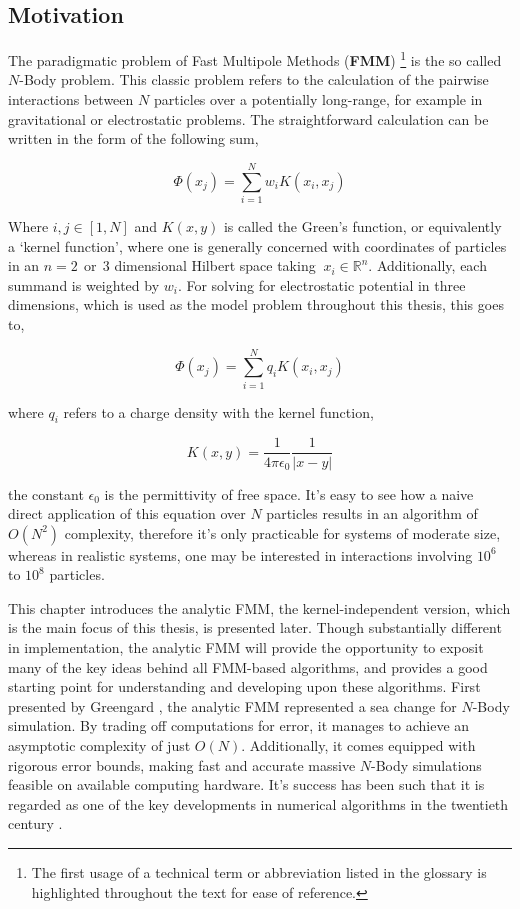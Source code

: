 \subsection{Motivation}
The paradigmatic problem of Fast Multipole Methods (\textbf{\gls{FMM}})
\footnote{The first usage of a technical term or abbreviation listed in the
glossary is highlighted throughout the text for ease of reference.} is the so
called $N$-Body problem. This classic problem refers to the calculation of the pairwise
interactions between $N$ particles over a potentially long-range, for example in
gravitational or electrostatic problems. The straightforward calculation can be
written in the form of the following sum,

\begin{equation}
\Phi(x_j) = \sum_{i=1}^N w_i K(x_i, x_j)
\label{eq:n_body_problem}
\end{equation}

Where $i, j \in [1,N]$ and $K(x, y)$ is called the Green's function, or equivalently
a `kernel function', where one is generally concerned with coordinates of particles in an
$n=2 \> \> \text{or} \> \> 3$ dimensional Hilbert space taking  $\ x_i \in \mathbb{R}^n$.
Additionally, each summand is weighted by $w_i$. For solving for electrostatic
potential in three dimensions, which is used as the model problem throughout this
thesis, this goes to,

\begin{equation}
\Phi(x_j) = \sum_{i=1}^N q_iK(x_i, x_j)
\label{eq:electrostatic_paradigm}
\end{equation}

where $q_i$ refers to a charge density with the kernel function,

\begin{equation}
    K(x, y) = \frac{1}{4\pi \epsilon_0}\frac{1}{| x - y |}
\label{eq:laplace_kernel}
\end{equation}

the constant $\epsilon_0$ is the permittivity of free space. It's easy to see
how a naive direct application of this equation over $N$ particles
results in an algorithm of $O(N^2)$ complexity, therefore it's only practicable
for systems of moderate size, whereas in realistic systems, one may be interested in
interactions involving $10^{6}$ to $10^8$ particles.

This chapter introduces the analytic \gls{FMM}, the kernel-independent
version, which is the main focus of this thesis, is presented later.
Though substantially different in implementation, the analytic FMM will provide the opportunity
to exposit many of the key ideas behind all FMM-based algorithms, and provides
a good starting point for understanding and developing upon these algorithms.
First presented by Greengard \cite{Greengard:1987:Yale},
the analytic \gls{FMM} represented a sea change for $N$-Body simulation. By
trading off computations for error, it manages to achieve an asymptotic complexity
 of just $O(N)$. Additionally, it comes equipped with rigorous error bounds,
making fast and accurate massive $N$-Body simulations feasible on available
computing hardware. It's success has been such that it is regarded as one of
the key developments in numerical algorithms in the twentieth century \cite{Cipra:2000:SN}.

